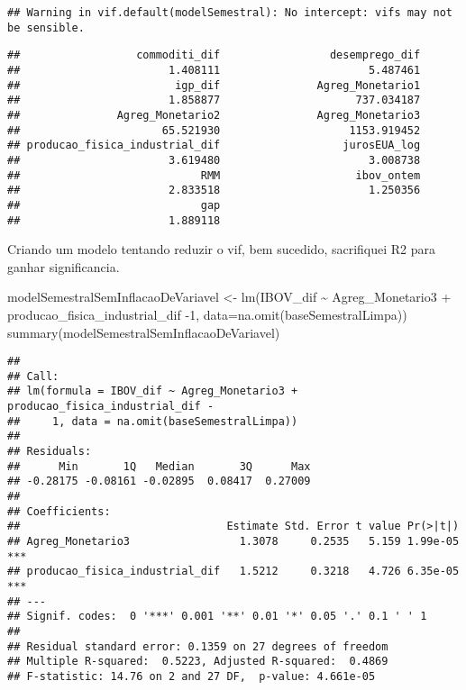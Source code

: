 \documentclass[
]{article}
\newenvironment{Shaded}{\begin{snugshade}}{\end{snugshade}}
\newcommand{\AttributeTok}[1]{\textcolor[rgb]{0.77,0.63,0.00}{#1}}
\newcommand{\DecValTok}[1]{\textcolor[rgb]{0.00,0.00,0.81}{#1}}
\newcommand{\FunctionTok}[1]{\textcolor[rgb]{0.00,0.00,0.00}{#1}}
\newcommand{\NormalTok}[1]{#1}
\newcommand{\OtherTok}[1]{\textcolor[rgb]{0.56,0.35,0.01}{#1}}
\newcommand{\SpecialCharTok}[1]{\textcolor[rgb]{0.00,0.00,0.00}{#1}}
\begin{document}
\begin{verbatim}
## Warning in vif.default(modelSemestral): No intercept: vifs may not be sensible.
\end{verbatim}

\begin{verbatim}
##                  commoditi_dif                 desemprego_dif 
##                       1.408111                       5.487461 
##                        igp_dif               Agreg_Monetario1 
##                       1.858877                     737.034187 
##               Agreg_Monetario2               Agreg_Monetario3 
##                      65.521930                    1153.919452 
## producao_fisica_industrial_dif                   jurosEUA_log 
##                       3.619480                       3.008738 
##                            RMM                     ibov_ontem 
##                       2.833518                       1.250356 
##                            gap 
##                       1.889118
\end{verbatim}

Criando um modelo tentando reduzir o vif, bem sucedido, sacrifiquei R2
para ganhar significancia.

\begin{Shaded}
\begin{Highlighting}[]
\NormalTok{modelSemestralSemInflacaoDeVariavel }\OtherTok{\textless{}{-}} \FunctionTok{lm}\NormalTok{(IBOV\_dif }\SpecialCharTok{\textasciitilde{}}\NormalTok{ Agreg\_Monetario3 }\SpecialCharTok{+}\NormalTok{ producao\_fisica\_industrial\_dif }\SpecialCharTok{{-}}\DecValTok{1}\NormalTok{, }\AttributeTok{data=}\FunctionTok{na.omit}\NormalTok{(baseSemestralLimpa))}
\FunctionTok{summary}\NormalTok{(modelSemestralSemInflacaoDeVariavel)}
\end{Highlighting}
\end{Shaded}

\begin{verbatim}
## 
## Call:
## lm(formula = IBOV_dif ~ Agreg_Monetario3 + producao_fisica_industrial_dif - 
##     1, data = na.omit(baseSemestralLimpa))
## 
## Residuals:
##      Min       1Q   Median       3Q      Max 
## -0.28175 -0.08161 -0.02895  0.08417  0.27009 
## 
## Coefficients:
##                                Estimate Std. Error t value Pr(>|t|)    
## Agreg_Monetario3                 1.3078     0.2535   5.159 1.99e-05 ***
## producao_fisica_industrial_dif   1.5212     0.3218   4.726 6.35e-05 ***
## ---
## Signif. codes:  0 '***' 0.001 '**' 0.01 '*' 0.05 '.' 0.1 ' ' 1
## 
## Residual standard error: 0.1359 on 27 degrees of freedom
## Multiple R-squared:  0.5223, Adjusted R-squared:  0.4869 
## F-statistic: 14.76 on 2 and 27 DF,  p-value: 4.661e-05
\end{verbatim}
\end{document}
